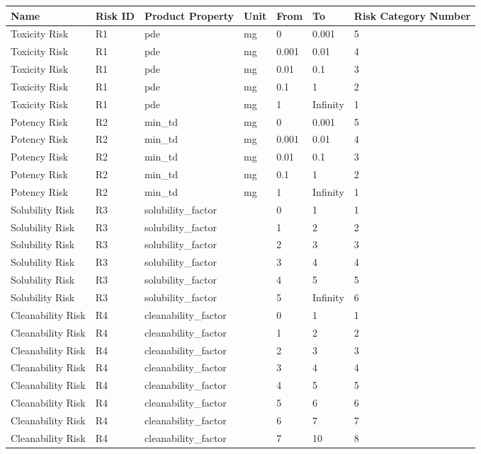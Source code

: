 \documentclass{article}
\begin{document}
        \begin{longtable}[l]{|p{3cm}|p{2cm}|p{3cm}|p{1.3cm}|p{1cm}|p{1cm}|p{4cm}|}

\hline
Name & Risk ID & Product Property & Unit & From & To & Risk Category Number\\
\hline

Toxicity Risk & R1 & pde & mg & 0 & 0.001 & 5\\
\hline
Toxicity Risk & R1 & pde & mg & 0.001 & 0.01 & 4\\
\hline
Toxicity Risk & R1 & pde & mg & 0.01 & 0.1 & 3\\
\hline
Toxicity Risk & R1 & pde & mg & 0.1 & 1 & 2\\
\hline
Toxicity Risk & R1 & pde & mg & 1 & Infinity & 1\\
\hline
Potency Risk & R2 & min\_td & mg & 0 & 0.001 & 5\\
\hline
Potency Risk & R2 & min\_td & mg & 0.001 & 0.01 & 4\\
\hline
Potency Risk & R2 & min\_td & mg & 0.01 & 0.1 & 3\\
\hline
Potency Risk & R2 & min\_td & mg & 0.1 & 1 & 2\\
\hline
Potency Risk & R2 & min\_td & mg & 1 & Infinity & 1\\
\hline
Solubility Risk & R3 & solubility\_factor &  & 0 & 1 & 1\\
\hline
Solubility Risk & R3 & solubility\_factor &  & 1 & 2 & 2\\
\hline
Solubility Risk & R3 & solubility\_factor &  & 2 & 3 & 3\\
\hline
Solubility Risk & R3 & solubility\_factor &  & 3 & 4 & 4\\
\hline
Solubility Risk & R3 & solubility\_factor &  & 4 & 5 & 5\\
\hline
Solubility Risk & R3 & solubility\_factor &  & 5 & Infinity & 6\\
\hline
Cleanability Risk & R4 & cleanability\_factor &  & 0 & 1 & 1\\
\hline
Cleanability Risk & R4 & cleanability\_factor &  & 1 & 2 & 2\\
\hline
Cleanability Risk & R4 & cleanability\_factor &  & 2 & 3 & 3\\
\hline
Cleanability Risk & R4 & cleanability\_factor &  & 3 & 4 & 4\\
\hline
Cleanability Risk & R4 & cleanability\_factor &  & 4 & 5 & 5\\
\hline
Cleanability Risk & R4 & cleanability\_factor &  & 5 & 6 & 6\\
\hline
Cleanability Risk & R4 & cleanability\_factor &  & 6 & 7 & 7\\
\hline
Cleanability Risk & R4 & cleanability\_factor &  & 7 & 10 & 8\\
\hline

    \end{longtable}
    
\end{document}
